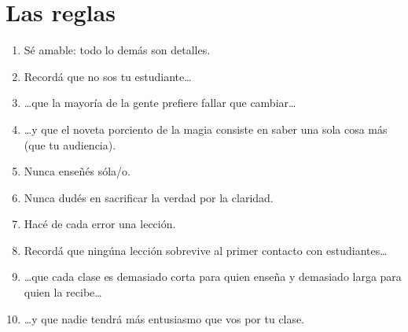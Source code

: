 \chapter*{Las reglas}

\begin{enumerate}

\item S\'e amable: todo lo dem\'as son detalles.\\

\item Record\'a que no sos tu estudiante{\ldots}\\

\item {\ldots}que la mayor\'ia de la gente prefiere fallar que cambiar{\ldots}\\

\item {\ldots}y que el noveta porciento de la magia consiste en saber una sola cosa m\'as (que tu audiencia).\\

\item Nunca ense\~n\'es s\'ola/o.\\

\item Nunca dud\'es en sacrificar la verdad por la claridad.\\

\item Hac\'e de cada error una lecci\'on.\\

\item Record\'a que ning\'una lecci\'on sobrevive al primer contacto con estudiantes{\ldots}\\

\item {\ldots}que cada clase es demasiado corta para quien ense\~na y demasiado larga para quien la recibe{\ldots}\\

\item {\ldots}y que nadie tendr\'a m\'as entusiasmo que vos por tu clase.

\end{enumerate}
